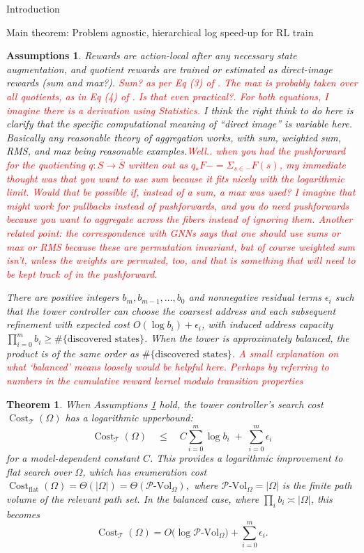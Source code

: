 \documentclass[11pt]{article}
\newtheorem{assumptions}[subsubsection]{Assumptions}
\newtheorem{theorem}[subsubsection]{Theorem}
\newcommand{\PVol}{\mathcal{P}\text{-}\mathrm{Vol}}
\newcommand{\cost}{\operatorname{Cost}}
\begin{document}
\begin{section}{Introduction}
\begin{subsection}{Main theorem: Problem agnostic, hierarchical log speed-up for RL train}
\begin{assumptions}\label{ass: simple ass}
Rewards are action-local after any necessary state augmentation, and quotient rewards are trained or estimated as direct-image rewards (sum and max?). \textcolor{red}{Sum? as per Eq (3) of \cite{HutsebautBuysseHRLSurvey}. The max is probably taken over all quotients, as in Eq (4) of \cite{HutsebautBuysseHRLSurvey}. Is that even practical?. For both equations, I imagine there is a derivation using Statistics.} {\color{blue} I think the right think to do here is clarify that the specific computational meaning of ``direct image'' is variable here. Basically any reasonable theory of aggregation works, with sum, weighted sum, RMS, and max being reasonable examples.}\textcolor{red}{Well.. when you had the pushforward for the quotienting $q:S \longrightarrow \bar{S}$ written out as $q_*F - = \Sigma_{s\in -} F(s)$, my immediate thought was that you want to use sum because it fits nicely with the logarithmic limit. Would that be possible if, instead of a sum, a max was used? I imagine that might work for pullbacks instead of pushforwards, and you do need pushforwards because you want to aggregate across the fibers instead of ignoring them. Another related point: the correspondence with GNNs says that one should use sums or max or RMS because these are permutation invariant, but of course weighted sum isn't, unless the weights are permuted, too, and that is something that will need to be kept track of in the pushforward.} 

There are positive integers $b_m,b_{m-1},\ldots,b_0$ and nonnegative residual terms $\epsilon_i$ such that the tower controller can choose the coarsest address and each subsequent refinement with expected cost
$O(\log b_i)+\epsilon_i$, with induced address capacity $\prod_{i=0}^{m} b_i \ge \#\{\text{discovered states}\}$.
When the tower is approximately balanced, the product is of the same order as $\#\{\text{discovered states}\}$. \textcolor{red}{A small explanation on what `balanced' means loosely would be helpful here. Perhaps by referring to numbers in the cumulative reward kernel modulo transition properties}
\end{assumptions}


\begin{theorem}\label{theorem: main}
When Assumptions \ref{ass: simple ass} hold, the tower controller's search cost $\cost_{\mathcal{T}}(\Omega)$ has a logarithmic upperbound:
$$
    \cost_{\mathcal{T}}(\Omega)
    \quad\le\quad
    C\sum_{i=0}^{m}\log b_i \;+\; \sum_{i=0}^{m}\epsilon_i
$$
for a model-dependent constant $C$. This provides a logarithmic improvement to flat search over $\Omega$, which has enumeration cost $
    \cost_{\mathrm{flat}}(\Omega)=\Theta(|\Omega|)=\Theta(\PVol_{\Omega}),
$
where $\PVol_{\Omega}=|\Omega|$ is the finite path volume of the relevant path set.  In the balanced case, where $\prod_i b_i\asymp |\Omega|$, this becomes
$$
    \cost_{\mathcal{T}}(\Omega)
    =O\bigl(\log \PVol_{\Omega}\bigr)+\sum_{i=0}^{m}\epsilon_i.
$$
\end{theorem}


\end{subsection}
\end{section}
\end{document}
